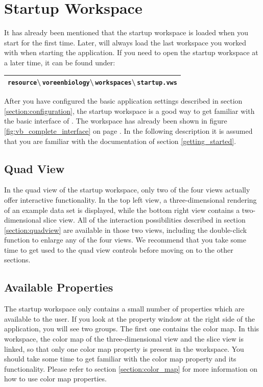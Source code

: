 \section{Startup Workspace} \label{startup_workspace}
\label{section:startup_workspace}

It has already been mentioned that the startup workspace is loaded when you start \Voreen for the first time. Later, \Voreen
will always load the last workspace you worked with when starting the application. If you need to open the
startup workspace at a later time, it can be found under:
\begin{center}
\begin{tabular}{|c|} \hline
\verb|resource|\textbackslash\,\verb|voreenbiology|\textbackslash\,\verb|workspaces|\textbackslash\,\verb|startup.vws| \\ \hline 
\end{tabular}
\end{center}
After you have configured the basic application settings described in section \ref{section:configuration}, the 
startup workspace is a good way to get familiar with the basic interface of \Voreen. 
The workspace has already been shown in figure \ref{fig:vb_complete_interface} on page \pageref{fig:vb_complete_interface}. 
In the following description it is assumed that you are familiar with the documentation of section \ref{getting_started}.
  
\subsection{Quad View}

In the quad view of the startup workspace, only two of the four views actually offer interactive functionality. In the top left
view, a three-dimensional rendering of an example data set is displayed, while the bottom right view contains a two-dimensional slice
view. All of the interaction possibilities described in section \ref{section:quadview} are available in those two views, including
the double-click function to enlarge any of the four views. We recommend that you take some time to get used to the quad view controls
before moving on to the other sections.

\subsection{Available Properties}

The startup workspace only contains a small number of properties which are available to the user. If you look at the property window 
at the right side of the application, you will see two groups. The first one contains the color map. In this workspace, the color map
of the three-dimensional view and the slice view is linked, so that only one color map property is present in the workspace. You should 
take some time to get familiar with the color map property and its functionality. Please refer to section \ref{section:color_map} for more
information on how to use color map properties.

